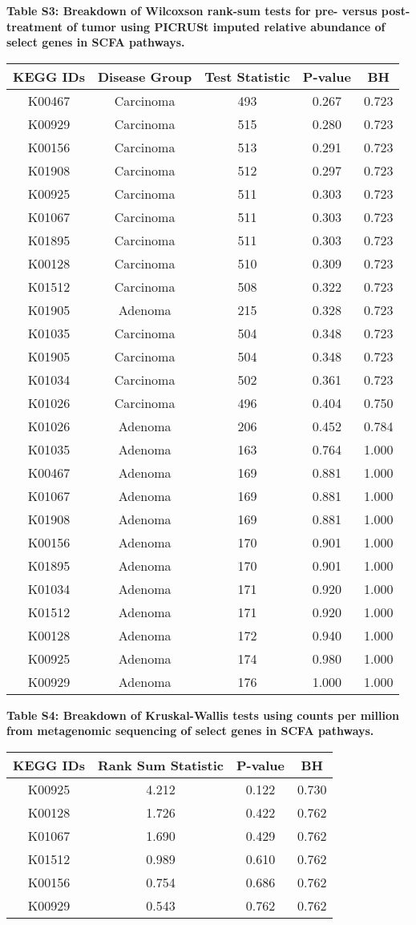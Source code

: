 \documentclass[11pt,]{article}
\begin{document}
\textbf{Table S3: Breakdown of Wilcoxson rank-sum tests for pre- versus
post-treatment of tumor using PICRUSt imputed relative abundance of
select genes in SCFA pathways.}

\begin{longtable}[]{@{}ccccc@{}}
\toprule
KEGG IDs & Disease Group & Test Statistic & P-value & BH\tabularnewline
\midrule
\endhead
K00467 & Carcinoma & 493 & 0.267 & 0.723\tabularnewline
K00929 & Carcinoma & 515 & 0.280 & 0.723\tabularnewline
K00156 & Carcinoma & 513 & 0.291 & 0.723\tabularnewline
K01908 & Carcinoma & 512 & 0.297 & 0.723\tabularnewline
K00925 & Carcinoma & 511 & 0.303 & 0.723\tabularnewline
K01067 & Carcinoma & 511 & 0.303 & 0.723\tabularnewline
K01895 & Carcinoma & 511 & 0.303 & 0.723\tabularnewline
K00128 & Carcinoma & 510 & 0.309 & 0.723\tabularnewline
K01512 & Carcinoma & 508 & 0.322 & 0.723\tabularnewline
K01905 & Adenoma & 215 & 0.328 & 0.723\tabularnewline
K01035 & Carcinoma & 504 & 0.348 & 0.723\tabularnewline
K01905 & Carcinoma & 504 & 0.348 & 0.723\tabularnewline
K01034 & Carcinoma & 502 & 0.361 & 0.723\tabularnewline
K01026 & Carcinoma & 496 & 0.404 & 0.750\tabularnewline
K01026 & Adenoma & 206 & 0.452 & 0.784\tabularnewline
K01035 & Adenoma & 163 & 0.764 & 1.000\tabularnewline
K00467 & Adenoma & 169 & 0.881 & 1.000\tabularnewline
K01067 & Adenoma & 169 & 0.881 & 1.000\tabularnewline
K01908 & Adenoma & 169 & 0.881 & 1.000\tabularnewline
K00156 & Adenoma & 170 & 0.901 & 1.000\tabularnewline
K01895 & Adenoma & 170 & 0.901 & 1.000\tabularnewline
K01034 & Adenoma & 171 & 0.920 & 1.000\tabularnewline
K01512 & Adenoma & 171 & 0.920 & 1.000\tabularnewline
K00128 & Adenoma & 172 & 0.940 & 1.000\tabularnewline
K00925 & Adenoma & 174 & 0.980 & 1.000\tabularnewline
K00929 & Adenoma & 176 & 1.000 & 1.000\tabularnewline
\bottomrule
\end{longtable}

\newpage

\textbf{Table S4: Breakdown of Kruskal-Wallis tests using counts per
million from metagenomic sequencing of select genes in SCFA pathways.}

\begin{longtable}[]{@{}cccc@{}}
\toprule
KEGG IDs & Rank Sum Statistic & P-value & BH\tabularnewline
\midrule
\endhead
K00925 & 4.212 & 0.122 & 0.730\tabularnewline
K00128 & 1.726 & 0.422 & 0.762\tabularnewline
K01067 & 1.690 & 0.429 & 0.762\tabularnewline
K01512 & 0.989 & 0.610 & 0.762\tabularnewline
K00156 & 0.754 & 0.686 & 0.762\tabularnewline
K00929 & 0.543 & 0.762 & 0.762\tabularnewline
\bottomrule
\end{longtable}
\end{document}
